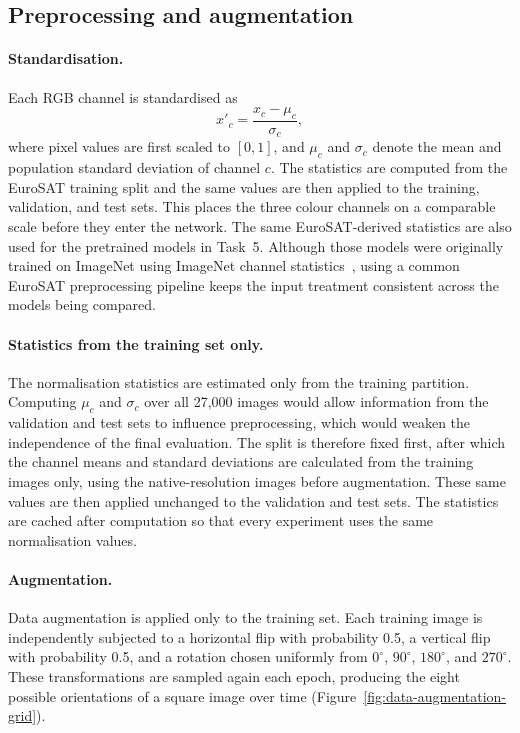 
\subsection{Preprocessing and augmentation}
\label{sec:data-preparation}

\paragraph{Standardisation.}
Each RGB channel is standardised as
\begin{equation}
  x'_c = \frac{x_c-\mu_c}{\sigma_c},
  \label{eq:standardisation}
\end{equation}
where pixel values are first scaled to $[0,1]$, and $\mu_c$ and $\sigma_c$
denote the mean and population standard deviation of channel $c$. The
statistics are computed from the EuroSAT training split and the same values
are then applied to the training, validation, and test sets. This places the
three colour channels on a comparable scale before they enter the network. The
same EuroSAT-derived statistics are also used for the pretrained models in
Task~5. Although those models were originally trained on ImageNet using
ImageNet channel statistics~\cite{deng2009imagenet}, using a common EuroSAT
preprocessing pipeline keeps the input treatment consistent across the models
being compared.

\paragraph{Statistics from the training set only.}
The normalisation statistics are estimated only from the training partition.
Computing $\mu_c$ and $\sigma_c$ over all 27,000 images would allow
information from the validation and test sets to influence preprocessing,
which would weaken the independence of the final evaluation. The split is
therefore fixed first, after which the channel means and standard deviations
are calculated from the training images only, using the native-resolution
images before augmentation. These same values are then applied unchanged to
the validation and test sets. The statistics are cached after computation so
that every experiment uses the same normalisation values.

\paragraph{Augmentation.}
Data augmentation is applied only to the training set. Each training image is
independently subjected to a horizontal flip with probability 0.5, a vertical
flip with probability 0.5, and a rotation chosen uniformly from $0^\circ$,
$90^\circ$, $180^\circ$, and $270^\circ$. These transformations are sampled
again each epoch, producing the eight possible orientations of a square image
over time (Figure~\ref{fig:data-augmentation-grid}).


